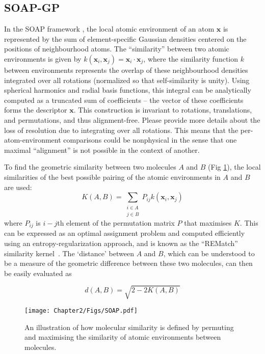 \subsection{SOAP-GP}
In the SOAP framework \cite{bartok2013representing}, the local atomic environment of an atom $\textbf{x}$ is represented by the sum of element-specific Gaussian densities centered on the positions of neighbourhood atoms. The ``similarity'' between two atomic environments is given by $k(\textbf{x}_{i}, \textbf{x}_{j}) = \textbf{x}_{i} \cdot \textbf{x}_{j}$, where the similarity function $k$ between environments represents the overlap of these neighbourhood densities integrated over all rotations (normalized so that self-similarity is unity). Using spherical harmonics and radial basis functions, this integral can be analytically computed as a truncated sum of coefficients -- the vector of these coefficients forms the descriptor $\textbf{x}$. This construction is invariant to rotations, translations, and permutations, and thus alignment-free. 
Please provide more details about the loss of resolution due to integrating over all
rotations. This means that the per-atom-environment comparisons could be nonphysical
in the sense that one maximal “alignment” is not possible in the context of another.

To find the geometric similarity between two molecules $A$ and $B$ (Fig \ref{fig:soap}), the local similarities of the best possible pairing of the atomic environments in $A$ and $B$ are used:
\begin{equation}\label{eq:rematch}
    K(A,B) = \displaystyle\sum_{\substack{i \in A\\ j \in B}}P_{ij}k(\textbf{x}_{i}, \textbf{x}_{j})
\end{equation}
where $P_{ij}$ is $i-j$th element of the permutation matrix $P$ that maximises $K$. This can be expressed as an optimal assignment problem and computed efficiently using an entropy-regularization approach, and is known as the ``REMatch'' similarity kernel~\cite{de2016comparing}. The `distance' between $A$ and $B$, which can be understood to be a measure of the geometric difference between these two molecules, can then be easily evaluated as

\begin{equation}\label{eq:distance}
    d(A, B) = \sqrt{2 - 2K(A, B)}
\end{equation}

\begin{figure}[!h] %
\centering
\texttt{[image: Chapter2/Figs/SOAP.pdf]}
\caption{\label{fig:soap} An illustration of how molecular similarity is defined by permuting and maximising the similarity of atomic environments between molecules.}
\end{figure}

